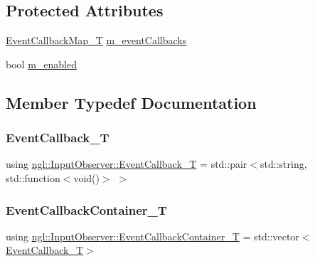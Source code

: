 \subsection*{Protected Attributes}
\begin{DoxyCompactItemize}
\item 
\mbox{\hyperlink{classngl_1_1_input_observer_af68ba9cdd29ed56f5f7aa85a36a45258}{Event\+Callback\+Map\+\_\+T}} \mbox{\hyperlink{classngl_1_1_input_observer_a1e5cc9f657f57237ccab542c3efc62b1}{m\+\_\+event\+Callbacks}}
\item 
bool \mbox{\hyperlink{classngl_1_1_input_observer_a04400ab36bc2ad26f7aa3d8553ff5c46}{m\+\_\+enabled}}
\end{DoxyCompactItemize}


\subsection{Member Typedef Documentation}
\mbox{\label{classngl_1_1_input_observer_aa4a14e946d8ea4c4195b5668b1fe1815}} 
\subsubsection{\texorpdfstring{Event\+Callback\+\_\+T}{EventCallback\_T}}
{\footnotesize\ttfamily using \mbox{\hyperlink{classngl_1_1_input_observer_aa4a14e946d8ea4c4195b5668b1fe1815}{ngl\+::\+Input\+Observer\+::\+Event\+Callback\+\_\+T}} =  std\+::pair$<$std\+::string, std\+::function$<$void()$>$ $>$}

\mbox{\label{classngl_1_1_input_observer_a42a0cd74782142e52f888e27aacef6f9}} 
\subsubsection{\texorpdfstring{Event\+Callback\+Container\+\_\+T}{EventCallbackContainer\_T}}
{\footnotesize\ttfamily using \mbox{\hyperlink{classngl_1_1_input_observer_a42a0cd74782142e52f888e27aacef6f9}{ngl\+::\+Input\+Observer\+::\+Event\+Callback\+Container\+\_\+T}} =  std\+::vector$<$\mbox{\hyperlink{classngl_1_1_input_observer_aa4a14e946d8ea4c4195b5668b1fe1815}{Event\+Callback\+\_\+T}}$>$}

